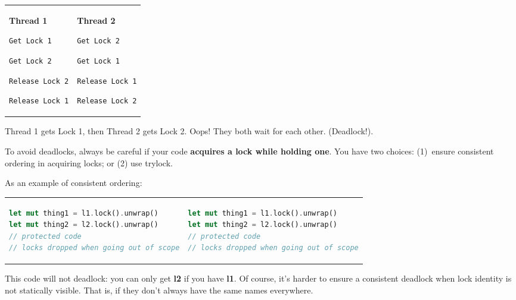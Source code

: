 \begin{center}
  \begin{tabular}{ll}
\begin{minipage}{.4\textwidth}
      {\bf Thread 1}

      \verb+Get Lock 1+

      \verb+Get Lock 2+

      \verb+Release Lock 2+

      \verb+Release Lock 1+
\end{minipage} &
\begin{minipage}{.4\textwidth}
      {\bf Thread 2}

      \verb+Get Lock 2+

      \verb+Get Lock 1+

      \verb+Release Lock 1+

      \verb+Release Lock 2+
\end{minipage}
\end{tabular}
\end{center}

 Thread 1 gets Lock 1, then Thread 2 gets Lock 2. Oops! They
 both wait for each other. (Deadlock!).

To avoid deadlocks, always be careful if your code {\bf acquires a
  lock while holding one}. You have two choices: (1)~ensure
consistent ordering in acquiring locks; or (2) use trylock.

\newpage
As an example of consistent ordering:
\begin{center}
\begin{tabular}{ll}
\begin{minipage}{.4\textwidth}
  \begin{lstlisting}[language=Rust]
let mut thing1 = l1.lock().unwrap()
let mut thing2 = l2.lock().unwrap()
// protected code
// locks dropped when going out of scope
\end{lstlisting}
\end{minipage}&
\begin{minipage}{.4\textwidth}
\begin{lstlisting}[language=Rust]
let mut thing1 = l1.lock().unwrap()
let mut thing2 = l2.lock().unwrap()
// protected code
// locks dropped when going out of scope
  \end{lstlisting}
\end{minipage}
\end{tabular}
\end{center}
This code will not deadlock: you can only get {\bf l2} if you have
{\bf l1}. Of course, it's harder to ensure a consistent deadlock when lock
identity is not statically visible. That is, if they don't always have the same names everywhere.

